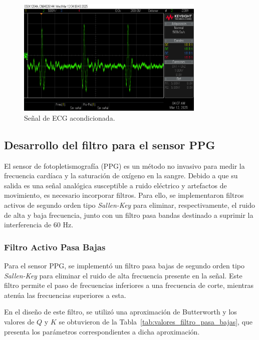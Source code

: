     \begin{figure}[H]
        \centering
        \includegraphics[width=0.8\textwidth]{img/Desarrollo/electro_osciloscopio.png}
        \caption{Señal de ECG acondicionada.}
        \label{fig:ECG_Osciloscopio}
    \end{figure}

    \subsection{Desarrollo del filtro para el sensor PPG}
    El sensor de fotopletismografía (PPG) es un método no invasivo para medir la frecuencia cardíaca y la saturación de oxígeno en la sangre. Debido a que su salida es una señal analógica susceptible a ruido eléctrico y artefactos de movimiento, es necesario incorporar filtros. Para ello, se implementaron filtros activos de segundo orden tipo \textit{Sallen-Key} para eliminar, respectivamente, el ruido de alta y baja frecuencia, junto con un filtro pasa bandas destinado a suprimir la interferencia de 60 Hz.

        \subsubsection{Filtro Activo Pasa Bajas}
        Para el sensor PPG, se implementó un filtro pasa bajas de segundo orden tipo \textit{Sallen-Key}
        para eliminar el ruido de alta frecuencia presente en la señal. Este filtro permite el paso de frecuencias inferiores a una frecuencia de corte, mientras atenúa las frecuencias superiores a esta.

        En el diseño de este filtro, se utilizó una aproximación de Butterworth y los valores de $Q$ y $K$ se obtuvieron de la Tabla~\ref{tab:valores_filtro_pasa_bajas}, que presenta los parámetros correspondientes a dicha aproximación.


